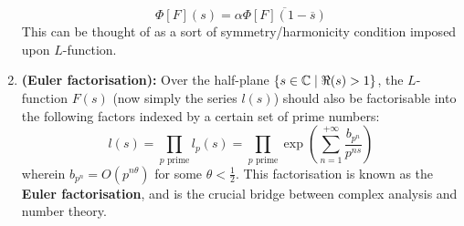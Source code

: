 \begin{definition}
\begin{enumerate}
                            $$\Phi[F](s) = \alpha \overline{\Phi[F](1 - \overline{s})}$$
                        This can be thought of as a sort of symmetry/harmonicity condition imposed upon $L$-function.
                        \item \textbf{(Euler factorisation):} Over the half-plane $\{s \in \mathbb{C} \mid \Re(s) > 1 \}$, the $L$-function $F(s)$ (now simply the series $l(s)$) should also be factorisable into the following factors indexed by a certain set of prime numbers:
                            $$l(s) = \prod_{\text{$p$ prime}} l_p(s) = \prod_{\text{$p$ prime}} \exp\left( \sum_{n = 1}^{+\infty} \frac{b_{p^n}}{p^{n s}} \right)$$
                        wherein $b_{p^n} = O(p^{n\theta})$ for some $\theta < \frac12$. This factorisation is known as the \textbf{Euler factorisation}, and is the crucial bridge between complex analysis and number theory.
                    \end{enumerate}
            \end{definition}
